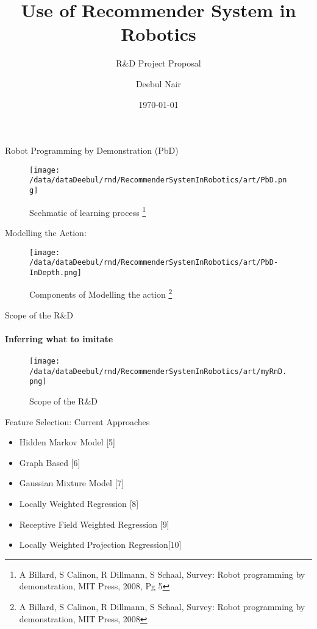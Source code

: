 \documentclass[mathserif,serif]{beamer}
\title[Crisis] %
{Use of Recommender System in Robotics}
\subtitle{R\&D Project Proposal }
\author[Nair, Deebul] %
{Deebul Nair}
\institute[Universities Here and There] %
{
    Advised by:\\
    \textbf{Prof. Dr. Paul Pl{\"o}ger}\\
    \textbf{Iman Awaad}
}
\date[KPT 2004] %
{\today}
\begin{document}
 \frame{\titlepage}
\begin{frame}{Robot Programming by Demonstration (PbD)}
\begin{figure}[htp]
\centering
\texttt{[image: /data/dataDeebul/rnd/RecommenderSystemInRobotics/art/PbD.png]}
\caption{Scehmatic of learning process
\footnote{\tiny{A Billard, S Calinon, R Dillmann, S Schaal, Survey: Robot programming by demonstration, MIT Press, 2008, Pg 5}}}
\label{Programming by Demonstration}

\end{figure}
\end{frame}


{\begin{frame}{Modelling the Action: }
\begin{figure}[htp]
\centering
\texttt{[image: /data/dataDeebul/rnd/RecommenderSystemInRobotics/art/PbD-InDepth.png]}
\caption{Components of Modelling the action
\footnote{\tiny{A Billard, S Calinon, R Dillmann, S Schaal, Survey: Robot programming by demonstration, MIT Press, 2008}}}

\label{}
\end{figure}
\end{frame}
}


\begin{frame}{Scope of the R\&D}
\framesubtitle{Inferring what to imitate}
\begin{figure}[htp]
\centering
\texttt{[image: /data/dataDeebul/rnd/RecommenderSystemInRobotics/art/myRnD.png]}
\caption{Scope of the R\&D}
\label{}
\end{figure}
\end{frame}
\begin{frame}{Feature Selection: Current Approaches}
\begin{itemize}
	\item Hidden Markov Model [5]
	\item Graph Based [6]
	\item Gaussian Mixture Model [7]
	\item Locally Weighted Regression [8]
	\item Receptive Field Weighted Regression [9]
	\item Locally Weighted Projection Regression[10] 
\end{itemize}
\end{frame}
\end{document}

